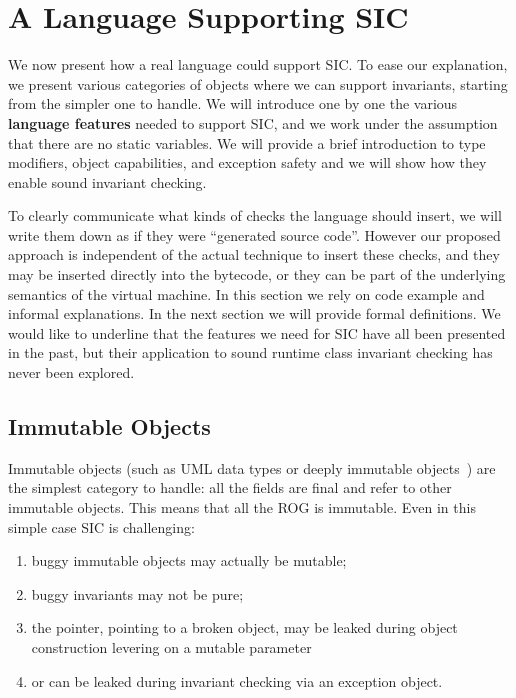 \saveSpace
\section{A Language Supporting SIC}
\label{s:language}
\saveSpace
We now present how a real language could support
SIC. To ease our explanation, we present various categories
of objects where we can support invariants, starting from the simpler one to handle.
We will introduce one by one the various
\textbf{language features} needed 
to support SIC, and we work under the assumption that there are no static variables.
We will provide a brief introduction to type modifiers, object capabilities, and exception safety and we will show how they enable sound invariant checking.

To clearly communicate what kinds of checks the language should insert,
 we will write them down as if they were ``generated source code''. 
However our proposed approach is independent of the actual technique to insert these checks, and they may be inserted directly into the bytecode, or they can be part of the underlying semantics of the virtual machine.
In this section we rely on code example and informal explanations. In the next section we will provide formal definitions.
We would like to underline that the
features we need for SIC have all been presented in the past, but their application to sound runtime class invariant checking has never been explored.
\saveSpace
\subsection{Immutable Objects}
\label{s:immutable}
\saveSpace
Immutable objects (such as UML data types or deeply immutable objects~\cite{Potanin2013}) are the simplest category to handle: all the fields are final and refer to other immutable objects.
This means that all the ROG is immutable.
Even in this simple case SIC  is challenging:
\begin{enumerate}
  \item buggy immutable objects may actually be mutable;
  \item buggy invariants may not be pure;
  \item the \Q@this@ pointer, pointing to a broken object, may be leaked during object
 construction levering on a mutable parameter
\item or can be leaked during invariant checking via an exception object.
\end{enumerate}
\saveSpace\saveSpace
